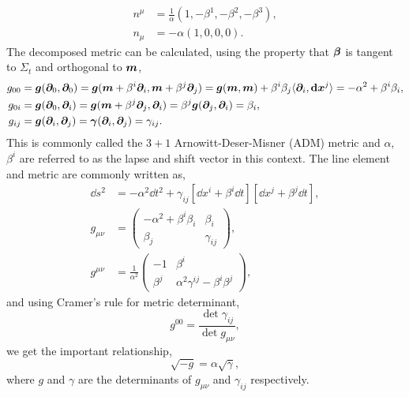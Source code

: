 \begin{align} 
n^\mu &=  \frac{1}{\alpha}\left( 1,-\beta^1,-\beta^2,-\beta^3\right),\\  
n_\mu &= -\alpha\left( 1,0,0,0\right).
\end{align}
The decomposed metric can be calculated, using the property that $\boldsymbol{\beta}$ is tangent to $\Sigma_t$ and orthogonal to $\boldsymbol{m}$,
\begin{align} 
g_{00} &= \boldsymbol{g}(\boldsymbol{\partial}_0,\boldsymbol{\partial}_0) = \boldsymbol{g}(\boldsymbol{m} + \beta^i \boldsymbol{\partial}_i,\boldsymbol{m} + \beta^j\boldsymbol{\partial}_j) = \boldsymbol{g}(\boldsymbol{m},\boldsymbol{m}) + \beta^i \beta_j \langle \boldsymbol{\partial}_i,{\boldsymbol{\mathrm{d}}} \boldsymbol{x}^j \rangle = -\alpha^2 + \beta^i \beta_i ,\\
 g_{0i} &= \boldsymbol{g} (\boldsymbol{\partial}_0,\boldsymbol{\partial}_i) =  \boldsymbol{g}(\boldsymbol{m} + \beta^j \boldsymbol{\partial}_j, \boldsymbol{\partial}_i) =   \beta^j\boldsymbol{g}( \boldsymbol{\partial}_j, \boldsymbol{\partial}_i) = \beta_i,\\
 g_{ij} &= \boldsymbol{g}(\boldsymbol{\partial}_i,\boldsymbol{\partial}_j) = \boldsymbol{\gamma}(\boldsymbol{\partial}_i,\boldsymbol{\partial}_j) = \gamma_{ij}.
 \end{align}
This is commonly called the $3+1$ Arnowitt-Deser-Misner (ADM) metric and $\alpha$, $\beta^i$ are referred to as the lapse and shift vector in this context. The line element and metric are commonly written as,
\begin{align}
\dd s^2 &= -\alpha^2 \dd t^2 + \gamma_{ij}\left[\dd x^i + \beta^i \dd t\right]\left[\dd x^j + \beta^j \dd t\right],\\
 g_{\mu\nu} &= \begin{pmatrix} -\alpha^2 + \beta^i \beta_i & \beta_i \\ \beta_j & \gamma_{ij} \end{pmatrix},\label{nr:eq:admmetric}\\
  g^{\mu\nu} &= \frac{1}{\alpha^2}\begin{pmatrix} -1  & \beta^i \\ \beta^j & \alpha^2\gamma^{ij} - \beta^i \beta^j \end{pmatrix},
 \end{align}
and using Cramer's rule for metric determinant,
\begin{equation} g^{00} = \frac{\det{\gamma_{ij}}}{\det{g_{\mu\nu}}},\end{equation}
we get the important relationship,
\begin{equation} \sqrt{-g} = \alpha \sqrt{\gamma} ,\label{nr:eq:gay}\end{equation}
where $g$ and $\gamma$ are the determinants of $g_{\mu\nu}$ and $\gamma_{ij}$ respectively.

